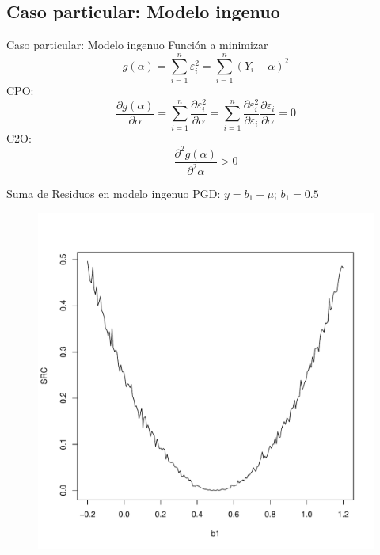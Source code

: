 \subsection{Caso particular: Modelo ingenuo}
\begin{frame}{Caso particular: Modelo ingenuo}
	Función a minimizar
		$$g(\alpha)=\sum_{i=1}^n \varepsilon _i ^2= \sum_{i=1}^n (Y_i-\alpha)^2$$
	CPO:
		$$\frac{\partial g(\alpha)}{\partial \alpha}=\sum_{i=1}^n \frac{\partial \varepsilon _i ^2}{\partial \alpha}=\sum_{i=1}^n \frac{\partial \varepsilon _i ^2}{\partial \varepsilon_i} \frac{\partial \varepsilon_i}{\partial \alpha}=0$$
	C2O:
		$$\frac{\partial^2 g(\alpha)}{\partial^2 \alpha}>0$$
\end{frame}
\begin{frame}{Suma de Residuos en modelo ingenuo}
	PGD: $y=b_1+\mu$; $b_1=0.5$
	\begin{figure}
		\centering
		\includegraphics[scale=.38]{fig/SRC0.pdf}
	\end{figure}
\end{frame}

